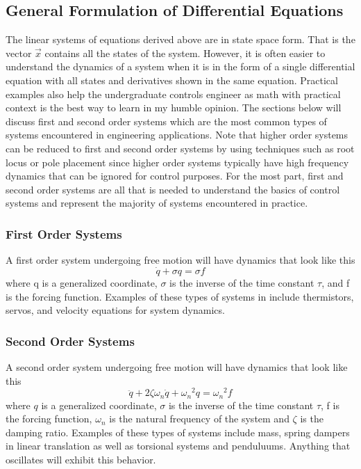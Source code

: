 \subsection{General Formulation of Differential Equations}

The linear systems of equations derived above are in state space form. That is the vector $\vec{x}$ contains all the states of the system. However, it is often easier to understand the dynamics of a system when it is in the form of a single differential equation with all states and derivatives shown in the same equation. Practical examples also help the undergraduate controls engineer as math with practical context is the best way to learn in my humble opinion. The sections below will discuss first and second order systems which are the most common types of systems encountered in engineering applications. Note that higher order systems can be reduced to first and second order systems by using techniques such as root locus or pole placement since higher order systems typically have high frequency dynamics that can be ignored for control purposes. For the most part, first and second order systems are all that is needed to understand the basics of control systems and represent the majority of systems encountered in practice.

\subsubsection{First Order Systems}

A first order system undergoing free motion will have dynamics that look like this
\begin{equation} \label{e:first_order}
\dot{q} + \sigma q = \sigma f
\end{equation}
\noindent where q is a generalized coordinate, $\sigma$ is the inverse of the time constant $\tau$, and f is the forcing function. Examples of these types of systems in include thermistors, servos, and velocity equations for system dynamics. 

\subsubsection{Second Order Systems}

A second order system undergoing free motion will have dynamics that look like this
\begin{equation}\label{e:second_order}
\ddot{q} + 2\zeta \omega_n \dot{q} + {\omega_n}^2 q = {\omega_n}^2 f
\end{equation}
where $q$ is a generalized coordinate, $\sigma$ is the inverse of the time constant $\tau$, f is the forcing function, $\omega_n$ is the natural frequency of the system and $\zeta$ is the damping ratio. Examples of these types of systems include mass, spring dampers in linear translation as well as torsional systems and penduluums. Anything that oscillates will exhibit this behavior. 

